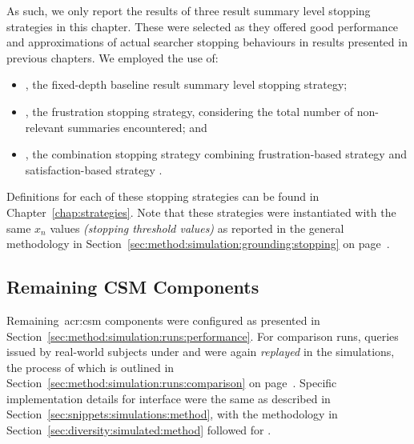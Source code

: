 As such, we only report the results of three result summary level stopping strategies in this chapter. These were selected as they offered good performance and approximations of actual searcher stopping behaviours in results presented in previous chapters. We employed the use of:

\begin{itemize}
    \item{, the fixed-depth baseline result summary level stopping strategy;}
    \item{, the frustration stopping strategy, considering the total number of non-relevant summaries encountered; and}
    \item{, the combination stopping strategy combining frustration-based strategy  and satisfaction-based strategy .}
\end{itemize}

Definitions for each of these stopping strategies can be found in Chapter~\ref{chap:strategies}. Note that these strategies were instantiated with the same $x_n$ values \emph{(stopping threshold values)} as reported in the general methodology in Section~\ref{sec:method:simulation:grounding:stopping} on page~\pageref{sec:method:simulation:grounding:stopping}.

\subsection{Remaining CSM Components}\label{sec:serp:method:other}
Remaining~\gls{acr:csm} components were configured as presented in Section~\ref{sec:method:simulation:runs:performance}. For comparison runs, queries issued by real-world subjects under  and  were again \emph{replayed} in the simulations, the process of which is outlined in Section~\ref{sec:method:simulation:runs:comparison} on page~\pageref{sec:method:simulation:runs:comparison}. Specific implementation details for interface  were the same as described in Section~\ref{sec:snippets:simulations:method}, with the methodology in Section~\ref{sec:diversity:simulated:method} followed for .

%

